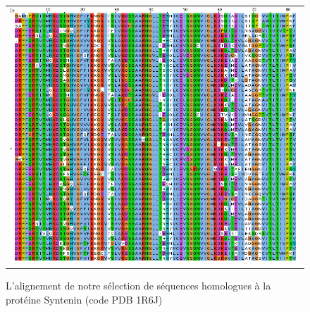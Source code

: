    \begin{figure}[t]
     \centering
     \begin{tabular}{c}
       \includegraphics[width=17cm]{homologues/1R6J.png} \\
     \end{tabular}
     \caption{L'alignement de notre sélection de séquences homologues à la protéine Syntenin (code PDB 1R6J)}
\label{align_homo:Syntenin}
   \end{figure}

